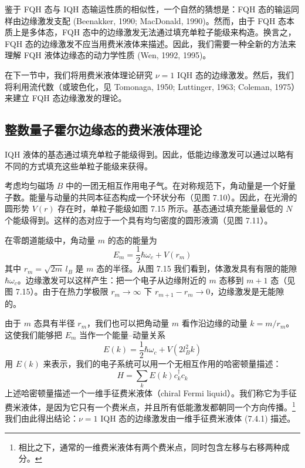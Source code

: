 鉴于 FQH 态与 IQH 态输运性质的相似性，一个自然的猜想是：FQH 态的输运同样由边缘激发支配 (Beenakker, 1990; MacDonald, 1990)。然而，由于 FQH 态本质上是多体态，FQH 态中的边缘激发无法通过填充单粒子能级来构造。换言之，FQH 态的边缘激发不应当用费米液体来描述。因此，我们需要一种全新的方法来理解 FQH 液体边缘态的动力学性质 (Wen, 1992, 1995)。

在下一节中，我们将用费米液体理论研究 $\nu=1$ IQH 态的边缘激发。然后，我们将利用流代数（或玻色化，见 Tomonaga, 1950; Luttinger, 1963; Coleman, 1975）来建立 FQH 态边缘激发的理论。

\subsection{整数量子霍尔边缘态的费米液体理论}

\begin{keypoints}
\item IQH 液体的基态通过填充单粒子能级得到。因此，低能边缘激发可以通过以略有不同的方式填充这些单粒子能级来获得。
\end{keypoints}

考虑均匀磁场 $B$ 中的一团无相互作用电子气。在对称规范下，角动量是一个好量子数。能量与动量的共同本征态构成一个环状分布（见图 7.10）。因此，在光滑的圆形势 $V(r)$ 存在时，单粒子能级如图 7.15 所示。基态通过填充能量最低的 $N$ 个能级得到。这样的态对应于一个具有均匀密度的圆形液滴（见图 7.11）。


在零朗道能级中，角动量 $m$ 的态的能量为
\begin{equation*}
E_{m}=\frac{1}{2}\hbar\omega_{c}+V(r_{m})
\end{equation*}
其中 $r_{m}=\sqrt{2m}\,l_{B}$ 是 $m$ 态的半径。从图 7.15 我们看到，体激发具有有限的能隙 $\hbar\omega_{c}$。边缘激发可以这样产生：把一个电子从边缘附近的 $m$ 态移到 $m+1$ 态（见图 7.15）。由于在热力学极限 $r_{m}\to\infty$ 下 $r_{m+1}-r_{m}\to0$，边缘激发是无能隙的。

由于 $m$ 态具有半径 $r_{m}$，我们也可以把角动量 $m$ 看作沿边缘的动量 $k=m/r_{m}$。这使我们能够把 $E_{m}$ 当作一个能量--动量关系
\begin{equation*}
E(k)=\frac{1}{2}\hbar\omega_{c}+V(2l_{B}^{2}k)
\end{equation*}
用 $E(k)$ 来表示，我们的电子系统可以用一个无相互作用的哈密顿量描述：
\begin{equation*}
H=\sum_{k}E(k)c_{k}^{\dagger}c_{k} \tag{7.4.1}
\end{equation*}
上述哈密顿量描述一个一维手征费米液体（chiral Fermi liquid）。我们称它为手征费米液体，是因为它只有一个费米点，并且所有低能激发都朝同一个方向传播。\footnote{相比之下，通常的一维费米液体有两个费米点，同时包含左移与右移两种成分。}我们由此得出结论：$\nu=1$ IQH 态的边缘激发由一维手征费米液体 (7.4.1) 描述。

